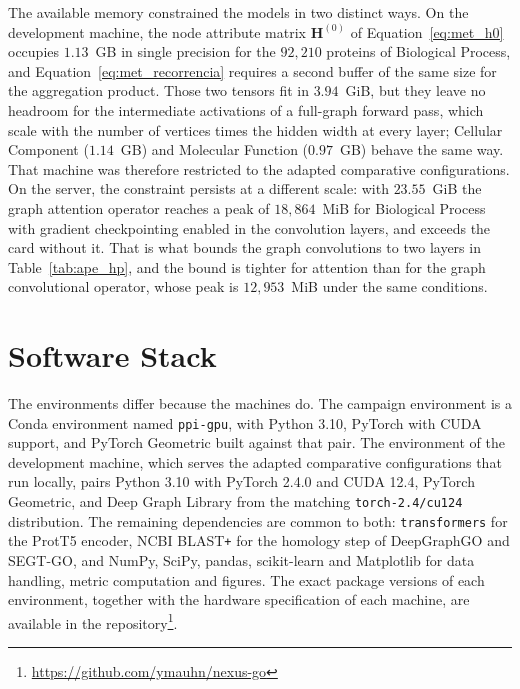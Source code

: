 \documentclass[Ingles]{ic-tese-v3}
\begin{document}
\begin{appendices}{}
The available memory constrained the models in two distinct ways. On the development machine, the
node attribute matrix $\mathbf{H}^{(0)}$ of Equation~\eqref{eq:met_h0} occupies $1.13$~GB in single
precision for the $92{,}210$ proteins of Biological Process, and Equation~\eqref{eq:met_recorrencia}
requires a second buffer of the same size for the aggregation product. Those two tensors fit in
$3.94$~GiB, but they leave no headroom for the intermediate activations of a full-graph forward pass,
which scale with the number of vertices times the hidden width at every layer; Cellular Component
($1.14$~GB) and Molecular Function ($0.97$~GB) behave the same way. That machine was therefore
restricted to the adapted comparative configurations. On the server, the constraint persists at a
different scale: with $23.55$~GiB the graph attention operator reaches a peak of $18{,}864$~MiB for
Biological Process with gradient checkpointing enabled in the convolution layers, and exceeds the
card without it. That is what bounds the graph convolutions to two layers in
Table~\ref{tab:ape_hp}, and the bound is tighter for attention than for the graph convolutional
operator, whose peak is $12{,}953$~MiB under the same conditions.

\section{Software Stack}
\label{ape:bibliotecas}

The environments differ because the machines do. The campaign environment is a Conda environment
named \texttt{ppi-gpu}, with Python 3.10, PyTorch with CUDA support, and PyTorch Geometric built
against that pair. The environment of the development machine, which serves the adapted comparative
configurations that run locally, pairs Python 3.10 with PyTorch 2.4.0 and CUDA 12.4, PyTorch
Geometric, and Deep Graph Library from the matching \texttt{torch-2.4/cu124} distribution. The
remaining dependencies are common to both: \texttt{transformers} for the ProtT5 encoder, NCBI
BLAST\texttt{+} for the homology step of DeepGraphGO and SEGT-GO, and NumPy, SciPy, pandas,
scikit-learn and Matplotlib for data handling, metric computation and figures. The exact package
versions of each environment, together with the hardware specification of each machine, are
available in the repository\footnote{\url{https://github.com/ymauhn/nexus-go}}.


\end{appendices}
\end{document}
